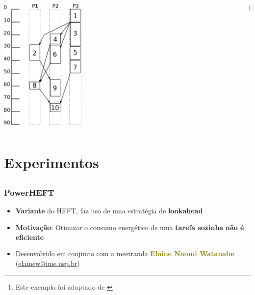 \documentclass{beamer}
\newcommand{\colorize}[2]{\textbf{\textcolor{#1}{#2}}}
\begin{document}
\begin{frame}
\begin{columns}[c]
	\begin{column}[c]{.4\textwidth} %
		\includegraphics[height=6.5cm]{escalonamento_heft.pdf}
	\end{column}
	
	\footnote{Este exemplo foi adaptado de \cite{topcoglu:heft}}
\end{columns}
\end{frame}



\section{Experimentos}
\subsection{}


\begin{frame}
\frametitle{PowerHEFT}
\begin{itemize}
	\item \colorize{n_orange}{Variante} do HEFT, faz uso de uma estratégia de \colorize{n_blue}{lookahead}
	\item \colorize{n_green}{Motivação}: Otimizar o consumo energético de uma
		\colorize{n_yellow}{tarefa sozinha} \colorize{n_violet}{não é eficiente}
	\item Desenvolvido em conjunto com a mestranda \colorize{olive}{Elaine Naomi Watanabe}
	(\url{elainew@ime.usp.br})
\end{itemize}

\end{frame}
\end{document}
